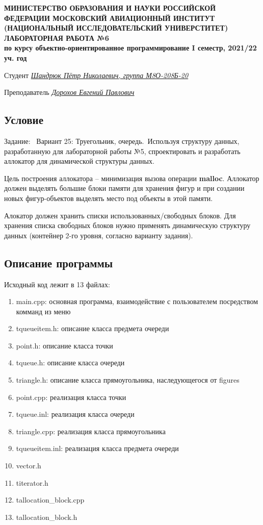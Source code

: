 \documentclass[12pt]{article}
\begin{document}
\begin{titlepage}
\begin{center}
\textbf{МИНИСТЕРСТВО ОБРАЗОВАНИЯ И НАУКИ РОССИЙСКОЙ ФЕДЕРАЦИИ
\medskip
МОСКОВСКИЙ АВИАЦИОННЫЙ ИНСТИТУТ
(НАЦИОНАЛЬНЫЙ ИССЛЕДОВАТЕЛЬСКИЙ УНИВЕРСТИТЕТ)
\vfill\vfill
{\Huge ЛАБОРАТОРНАЯ РАБОТА №6} \\
по курсу объектно-ориентированное программирование
I семестр, 2021/22 уч. год}
\end{center}
\vfill

Студент \uline{\it {Шандрюк Пётр Николаевич, группа М8О-208Б-20}\hfill}

Преподаватель \uline{\it {Дорохов Евгений Павлович}\hfill}

\vfill
\end{titlepage}

\subsection*{Условие}

Задание: \
Вариант 25: Труегольник, очередь.\
Используя структуру данных, разработанную для лабораторной работы №5, спроектировать и
разработать аллокатор для динамической структуры данных.


Цель построения аллокатора – минимизация вызова операции \textbf{malloc}. Аллокатор должен
выделять большие блоки памяти для хранения фигур и при создании новых фигур-объектов
выделять место под объекты в этой памяти.


Алокатор должен хранить списки использованных/свободных блоков. Для хранения списка
свободных блоков нужно применять динамическую структуру данных (контейнер 2-го уровня,
согласно варианту задания).

\subsection*{Описание программы}

Исходный код лежит в 13 файлах:
\begin{enumerate}
\item main.cpp: основная программа, взаимодействие с пользователем посредством комманд из меню
\item tqueueitem.h:    описание класса предмета очереди
\item point.h:     описание класса точки
\item tqueue.h:  описание класса очереди
\item triangle.h: описание класса прямоугольника, наследующегося от figures
\item point.cpp:     реализация класса точки
\item tqueue.inl:  реализация класса очереди
\item triangle.cpp: реализация класса прямоугольника
\item tqueueitem.inl:    реализация класса предмета очереди
\item vector.h
\item titerator.h
\item tallocation_block.cpp
\item tallocation_block.h

\end{enumerate}
\end{document}
